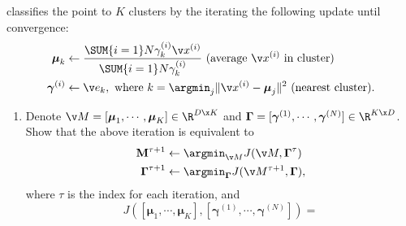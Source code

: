 






classifies the point to $K$ clusters by the iterating the following update until convergence:
\begin{equation*}
\begin{split}
\boldsymbol\mu_k &\leftarrow \frac{\SUM{i=1}N \gamma_k^{(i)} \v x^{(i)} }{\SUM{i=1}N \gamma_k^{(i)}} \text{ (average $\v x^{(i)}$ in cluster)} \\
\boldsymbol\gamma^{(i)} &\leftarrow \v e_k, \text{ where } k = \argmin_{j}\|\v x^{(i)} - \boldsymbol\mu_j\|^2 \text{ (nearest cluster)}.
\end{split}
\end{equation*}
%
\begin{enumerate}[label=(\alph*)]
	\item
	Denote $\v M = [\boldsymbol\mu_1, \cdots, \boldsymbol\mu_K] \in\R^{D\x K}$ and $\boldsymbol\Gamma = [\boldsymbol\gamma^{(1)}, \cdots, \boldsymbol\gamma^{(N)}] \in \R^{K\x D}$. Show that the above iteration is equivalent to 
	\begin{equation*}
	\begin{split}
		\mathbf M^{\tau+1} &\leftarrow \argmin_{\v M} J(\v M, \boldsymbol\Gamma^\tau) \\
		\boldsymbol\Gamma^{\tau+1} &\leftarrow \argmin_{\boldsymbol\Gamma} J(\v M^{\tau+1}, \boldsymbol\Gamma), 
	\end{split}
	\end{equation*}
	where $\tau$ is the index for each iteration, and 
	\begin{equation*}
		J([\boldsymbol\mu_1, \cdots, \boldsymbol\mu_K], [\boldsymbol\gamma^{(1)}, \cdots, \boldsymbol\gamma^{(N)}]) = 
	\end{equation*}
\end{enumerate}
